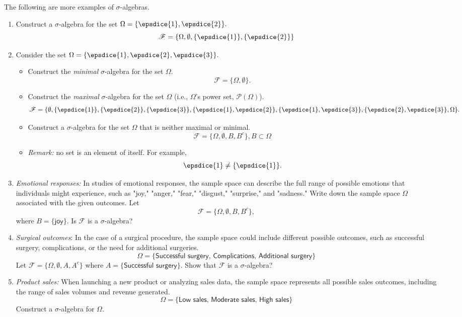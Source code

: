 \documentclass{tufte-handout}
\begin{document}
The following are more examples of $\sigma$-algebras.

\begin{enumerate} 

\item Construct a $\sigma$-algebra for the set $\Omega = \{\epsdice{1},\epsdice{2}\}.$
$$\mathscr F = \{\Omega, \emptyset,  \{\epsdice{1}\},\{\epsdice{2}\}\}$$
\item Consider the set $\Omega = \{\epsdice{1},\epsdice{2},\epsdice{3}\}.$ 
\begin{itemize} 
\item Construct the \textit{minimal } $\sigma$-algebra for the set $\Omega$.
$$\mathscr F = \{\Omega, \emptyset\}.$$
\item Construct the \textit{maximal}  $\sigma$-algebra for the set $\Omega$ (i.e., $\Omega$'s power set, $\mathscr P(\Omega)$).
$$\mathscr F = \{ \emptyset,  \{\epsdice{1}\} ,\{\epsdice{2}\}, \{\epsdice{3}\}, \{\epsdice{1},\epsdice{2}\}, \{\epsdice{1},\epsdice{3}\}, \{\epsdice{2},\epsdice{3}\}, \Omega\}.$$
\item Construct a  $\sigma$-algebra for the set $\Omega$ that is neither maximal or minimal.
 $$\mathscr F = \{\Omega, \emptyset, B, B^c \}, B\subset \Omega$$
 \item \textit{Remark:} no set is an element of itself. For example,  $$\epsdice{1} \neq \{\epsdice{1}\}. $$
\end{itemize}

\item \textit{Emotional responses:} In studies of emotional responses, the sample space can describe the full range of possible emotions that individuals might experience, such as "joy," "anger," "fear," "disgust," "surprise," and "sadness." Write down the sample space $\Omega$  associated with the given outcomes. Let $$\mathscr F = \{\Omega, \emptyset, B, B^c \},$$ where $B=\{\textsf{joy}\}$. 
 Is $\mathscr F$ is a $\sigma$-algebra?  

\item \textit{Surgical outcomes}: In the case of a surgical procedure, the sample space could include different possible outcomes, such as successful surgery, complications, or the need for additional surgeries.
$$\Omega= \{\textsf{Successful surgery, Complications, Additional surgery}\}$$
Let $\mathscr F = \{\Omega, \emptyset, A, A^c \}$ where $A= \{\textsf{Successful surgery}\}$.  Show that $\mathscr F$ is a $\sigma$-algebra?
\item \textit{Product sales:} When launching a new product or analyzing sales data, the sample space represents all possible sales outcomes, including the range of sales volumes and revenue generated.
$$\Omega = \{\textsf{Low sales, Moderate sales, High sales}\}$$
Construct a $\sigma$-algebra for  $\Omega$.


\end{enumerate}
\end{document}
